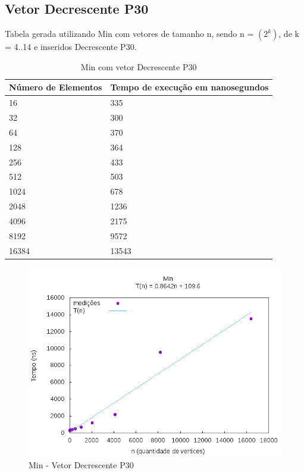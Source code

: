 \documentclass[12pt,a4paper,twoside]{report}
\begin{document}
\subsection{Vetor Decrescente P30}
Tabela gerada utilizando Min com vetores de tamanho n, sendo n = $(2^k)$, de k = 4..14 e inseridos Decrescente P30.
\begin{table}[H]
\centering
\caption{Min com vetor Decrescente P30}
\label{my-label}
\begin{tabular}{|l|l|}
\hline
\multicolumn{1}{|c|}{\textbf{Número de Elementos}} & \multicolumn{1}{c|}{\textbf{Tempo de execução em nanosegundos}} \\ \hline
16 & 335 \\ \hline
32 & 300 \\ \hline
64 & 370 \\ \hline
128 & 364 \\ \hline
256 & 433 \\ \hline
512 & 503 \\ \hline
1024 & 678 \\ \hline
2048 & 1236 \\ \hline
4096 & 2175 \\ \hline
8192 & 9572 \\ \hline
16384 & 13543 \\ \hline

\end{tabular}
\end{table}

\begin{figure}[H]
    \centering
    \includegraphics[width=0.7\linewidth]{graficos/Min/Decrescente P30/Min.png}
  \caption{Min - Vetor Decrescente P30}
\end{figure}
\end{document}
